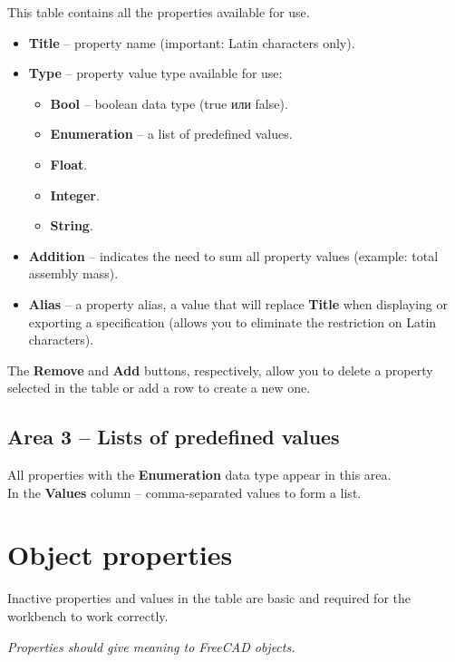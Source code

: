 \documentclass[a4paper,12pt]{article}
\begin{document}
This table contains all the properties available for use.
\begin{itemize}
	\item \textbf{Title} -- property name (important: Latin characters only).
	\item \textbf{Type} -- property value type available for use:
	\begin{itemize}
		\item \textbf{Bool} -- boolean data type (true или false).
		\item \textbf{Enumeration} -- a list of predefined values.
		\item \textbf{Float}.
		\item \textbf{Integer}.
		\item \textbf{String}.
	\end{itemize}
	\item \textbf{Addition} -- indicates the need to sum all property values ​​(example: total assembly mass).
	\item \textbf{Alias} -- a property alias, a value that will replace \textbf{Title} when displaying or exporting a specification (allows you to eliminate the restriction on Latin characters).
\end{itemize}

\begin{flushleft}The \textbf{Remove} and \textbf{Add} buttons, respectively, allow you to delete a property selected in the table or add a row to create a new one.\end{flushleft}

\subsection{Area 3 -- Lists of predefined values}
All properties with the \textbf{Enumeration} data type appear in this area.\\In the \textbf{Values} ​​column -- comma-separated values ​​to form a list.





\section{Object properties}

Inactive properties and values ​​in the table are basic and required for the workbench to work correctly.

\begin{center}\emph{Properties should give meaning to FreeCAD objects.}\end{center}
\end{document}
